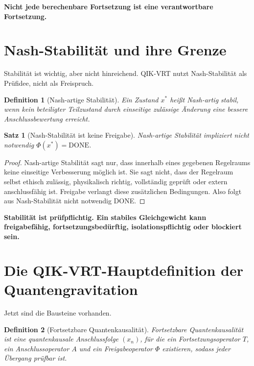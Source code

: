 \documentclass[11pt,a4paper,oneside]{scrartcl}
\theoremstyle{qikstyle}
\newtheorem{definition}{Definition}[section]
\newtheorem{satz}{Satz}[section]
\newcommand{\DONE}{\mathrm{DONE}}
\newcommand{\Phiop}{\Phi}
\newenvironment{merksatz}{\begin{center}\begin{minipage}{0.92\linewidth}\sffamily\bfseries}{\end{minipage}\end{center}}
\begin{document}
\begin{merksatz}
Nicht jede berechenbare Fortsetzung ist eine verantwortbare Fortsetzung.
\end{merksatz}
\newpage

\section{Nash-Stabilität und ihre Grenze}

Stabilität ist wichtig, aber nicht hinreichend. QIK-VRT nutzt Nash-Stabilität als Prüfidee, nicht als Freispruch.

\begin{definition}[Nash-artige Stabilität]
Ein Zustand \(x^*\) heißt Nash-artig stabil, wenn kein beteiligter Teilzustand durch einseitige zulässige Änderung eine bessere Anschlussbewertung erreicht.
\end{definition}

\begin{satz}[Nash-Stabilität ist keine Freigabe]
Nash-artige Stabilität impliziert nicht notwendig \(\Phiop(x^*)=\DONE\).
\end{satz}

\begin{proof}
Nash-artige Stabilität sagt nur, dass innerhalb eines gegebenen Regelraums keine einseitige Verbesserung möglich ist. Sie sagt nicht, dass der Regelraum selbst ethisch zulässig, physikalisch richtig, vollständig geprüft oder extern anschlussfähig ist. Freigabe verlangt diese zusätzlichen Bedingungen. Also folgt aus Nash-Stabilität nicht notwendig DONE.
\end{proof}

\begin{merksatz}
Stabilität ist prüfpflichtig. Ein stabiles Gleichgewicht kann freigabefähig, fortsetzungsbedürftig, isolationspflichtig oder blockiert sein.
\end{merksatz}
\newpage

\section{Die QIK-VRT-Hauptdefinition der Quantengravitation}

Jetzt sind die Bausteine vorhanden.

\begin{definition}[Fortsetzbare Quantenkausalität]
Fortsetzbare Quantenkausalität ist eine quantenkausale Anschlussfolge \((x_n)\), für die ein Fortsetzungsoperator \(T\), ein Anschlussoperator \(A\) und ein Freigabeoperator \(\Phiop\) existieren, sodass jeder Übergang prüfbar ist.
\end{definition}
\end{document}

